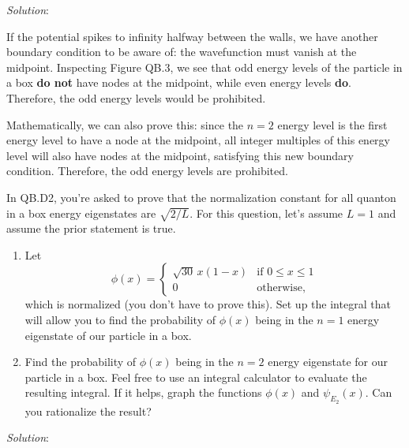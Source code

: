 \documentclass{article}
\begin{document}
\textit{Solution}:

\vspace{1em}

If the potential spikes to infinity halfway between the walls, we have another boundary condition to be aware of: the wavefunction must vanish at the midpoint. Inspecting Figure QB.3, we see that odd energy levels of the particle in a box \textbf{do not} have nodes at the midpoint, while even energy levels \textbf{do}. Therefore, the odd energy levels would be prohibited. 

\vspace{1em}

Mathematically, we can also prove this: since the $n=2$ energy level is the first energy level to have a node at the midpoint, all integer multiples of this energy level will also have nodes at the midpoint, satisfying this new boundary condition. Therefore, the odd energy levels are prohibited.

\newpage

\begin{tcolorbox}[colframe=blue!50!black, arc=2mm, title=\textsc{Practice 3}]
    In QB.D2, you're asked to prove that the normalization constant for all quanton in a box energy eigenstates are $\sqrt{2 / L}$. For this question, let's assume $L=1$ and assume the prior statement is true.
    \begin{enumerate}[label=(\alph*)]
        \item Let 
        \[
        \phi(x) = \begin{cases}
            \sqrt{30}\,x(1-x) & \text{if } 0 \le x \le 1 \\
            0 & \text{otherwise},
        \end{cases}
        \]
        which is normalized (you don't have to prove this). Set up the integral that will allow you to find the probability of $\phi(x)$ being in the $n=1$ energy eigenstate of our particle in a box.
        \item Find the probability of $\phi(x)$ being in the $n=2$ energy eigenstate for our particle in a box. Feel free to use an integral calculator to evaluate the resulting integral. If it helps, graph the functions $\phi(x)$ and $\psi_{E_2}(x)$. Can you rationalize the result?
    \end{enumerate}
\end{tcolorbox}

\textit{Solution}:
\end{document}
